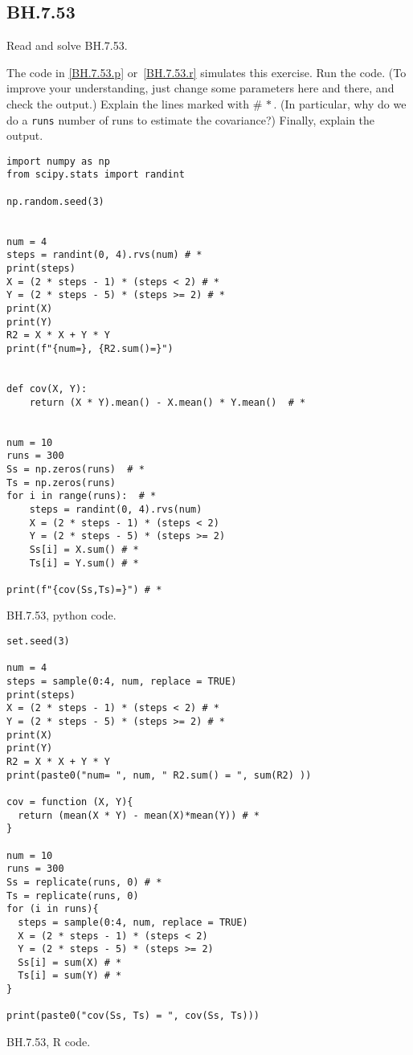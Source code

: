

\subsection{BH.7.53}
\label{sec:bh.53}

\begin{exercise}
Read and solve BH.7.53.
\end{exercise}


\begin{exercise}
The code in \cref{BH.7.53.p} or~\cref{BH.7.53.r} simulates this exercise.
Run the code. (To improve your understanding, just change some parameters here and there, and check the output.) Explain the lines marked with $\# \, *$. (In particular, why do we do a \verb|runs| number of runs to estimate the covariance?) Finally, explain the output.
\end{exercise}

\begin{listing}[!ht]
\begin{verbatim}
import numpy as np
from scipy.stats import randint

np.random.seed(3)


num = 4
steps = randint(0, 4).rvs(num) # *
print(steps)
X = (2 * steps - 1) * (steps < 2) # *
Y = (2 * steps - 5) * (steps >= 2) # *
print(X)
print(Y)
R2 = X * X + Y * Y
print(f"{num=}, {R2.sum()=}")


def cov(X, Y):
    return (X * Y).mean() - X.mean() * Y.mean()  # *


num = 10
runs = 300
Ss = np.zeros(runs)  # *
Ts = np.zeros(runs)
for i in range(runs):  # *
    steps = randint(0, 4).rvs(num)
    X = (2 * steps - 1) * (steps < 2)
    Y = (2 * steps - 5) * (steps >= 2)
    Ss[i] = X.sum() # *
    Ts[i] = Y.sum() # *

print(f"{cov(Ss,Ts)=}") # *
\end{verbatim}
\caption{BH.7.53, python code.}
\label{BH.7.53.p}


\end{listing}

\begin{listing}[!ht]
\begin{verbatim}
set.seed(3)

num = 4
steps = sample(0:4, num, replace = TRUE)
print(steps)
X = (2 * steps - 1) * (steps < 2) # *
Y = (2 * steps - 5) * (steps >= 2) # *
print(X)
print(Y)
R2 = X * X + Y * Y
print(paste0("num= ", num, " R2.sum() = ", sum(R2) ))

cov = function (X, Y){
  return (mean(X * Y) - mean(X)*mean(Y)) # *
}

num = 10
runs = 300
Ss = replicate(runs, 0) # *
Ts = replicate(runs, 0)
for (i in runs){
  steps = sample(0:4, num, replace = TRUE)
  X = (2 * steps - 1) * (steps < 2)
  Y = (2 * steps - 5) * (steps >= 2)
  Ss[i] = sum(X) # *
  Ts[i] = sum(Y) # *
}

print(paste0("cov(Ss, Ts) = ", cov(Ss, Ts)))
\end{verbatim}
\caption{BH.7.53, R code.}
\label{BH.7.53.r}
\end{listing}

